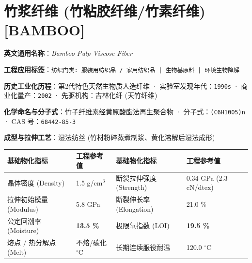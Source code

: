 \documentclass[11pt,openright,twoside,UTF8]{ctexbook}
\begin{document}
\section{竹浆纤维 (竹粘胶纤维/竹素纤维) [BAMBOO]}
\label{sec:bamboo}

\noindent\textbf{英文通用名称}：\textit{Bamboo Pulp Viscose Fiber}\par
\noindent\textbf{工程应用标签}：\texttt{纺织门类: 服装用纺织品 / 家用纺织品 | 生物基原料 | 环境生物降解}\par
\noindent\textbf{历史工业化历程}：第2代特色天然生物质人造纤维 · 实验室发现年代：\texttt{1990s} · 商业化量产：\texttt{2002} · 先驱机构：吉林化纤 (天竹纤维)\par
\noindent\textbf{化学命名与分子式}：竹子纤维素经黄原酸酯法再生聚合物 · 分子式：\texttt{(C6H10O5)n} · CAS 号：\texttt{68442-85-3}\par
\noindent\textbf{成型与拉伸工艺}：湿法纺丝 (竹材粉碎蒸煮制浆、黄化溶解后湿法成形)\par

\vspace{0.15cm}
\begin{center}
\small
\begin{tabularx}{\textwidth}{p{3.8cm}Xp{3.8cm}X}
\toprule
\textbf{基础物化指标} & \textbf{工程参考值} & \textbf{基础物化指标} & \textbf{工程参考值} \\
\midrule
晶体密度 (Density) & 1.5 g/cm$^3$ & 断裂拉伸强度 (Strength) & 0.34 GPa (2.3 cN/dtex) \\
拉伸初始模量 (Modulus) & 5.8 GPa & 断裂伸长率 (Elongation) & 21.0 \% \\
公定回潮率 (Moisture) & \textbf{13.5 \%} & 极限氧指数 (LOI) & \textbf{19.5 \%} \\
熔点 / 热分解点 (Melt) & 不熔/碳化 $^\circ\mathrm{C}$ & 长期连续服役耐温 & 120.0 $^\circ\mathrm{C}$ \\
\bottomrule
\end{tabularx}
\end{center}
\vspace{0.15cm}
\end{document}
